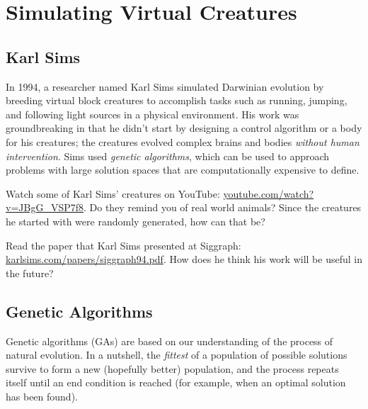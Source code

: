 \newcommand{\TODO}{\hl{\emph{TODO:}}\hl}

\chapter{Simulating Virtual Creatures}

\section{Karl Sims}

In 1994, a researcher named Karl Sims simulated Darwinian evolution by breeding 
virtual block creatures to accomplish tasks such as running, jumping, and following 
light sources in a physical environment. His work was groundbreaking in that he didn't 
start by designing a control algorithm or a body for his creatures; the creatures 
evolved complex brains and bodies {\em without human intervention}. Sims used 
{\em genetic algorithms}, which can be used to approach problems with large solution 
spaces that are computationally expensive to define.

\begin{ex}
  Watch some of Karl Sims' creatures on YouTube:
  \url{youtube.com/watch?v=JBgG_VSP7f8}. Do they remind you of real world
  animals? Since the creatures he started with were randomly generated, how can that be?
\end{ex}

\begin{ex}
  Read the paper that Karl Sims presented at Siggraph:
  \url{karlsims.com/papers/siggraph94.pdf}. How does he think his
  work will be useful in the future?
\end{ex}

\section{Genetic Algorithms}

Genetic algorithms (GAs) are based on our understanding of the process of 
natural evolution. In a nutshell, the {\em fittest} of a population of possible 
solutions survive to form a new (hopefully better) population, and the process
repeats itself until an end condition is reached (for example, when an optimal
solution has been found). 

